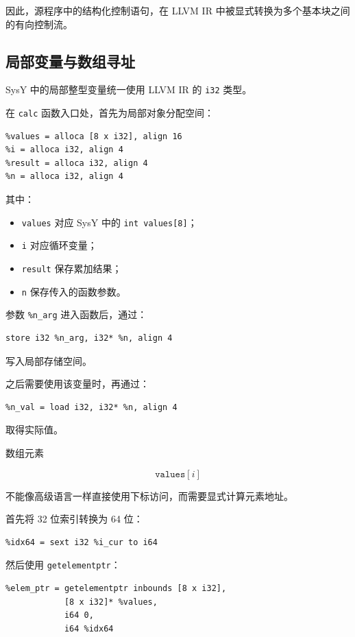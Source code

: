 \documentclass[12pt,a4paper]{ctexart}
\begin{document}
因此，源程序中的结构化控制语句，在 LLVM IR 中被显式转换为多个基本块之间的有向控制流。


\subsection{局部变量与数组寻址}

SysY 中的局部整型变量统一使用 LLVM IR 的 \texttt{i32} 类型。

在 \texttt{calc} 函数入口处，首先为局部对象分配空间：

\begin{lstlisting}
%values = alloca [8 x i32], align 16
%i = alloca i32, align 4
%result = alloca i32, align 4
%n = alloca i32, align 4
\end{lstlisting}

其中：

\begin{itemize}
    \item \texttt{values} 对应 SysY 中的 \texttt{int values[8]}；
    \item \texttt{i} 对应循环变量；
    \item \texttt{result} 保存累加结果；
    \item \texttt{n} 保存传入的函数参数。
\end{itemize}

参数 \texttt{\%n\_arg} 进入函数后，通过：

\begin{lstlisting}
store i32 %n_arg, i32* %n, align 4
\end{lstlisting}

写入局部存储空间。

之后需要使用该变量时，再通过：

\begin{lstlisting}
%n_val = load i32, i32* %n, align 4
\end{lstlisting}

取得实际值。

数组元素

\[
\texttt{values}[i]
\]

不能像高级语言一样直接使用下标访问，而需要显式计算元素地址。

首先将 32 位索引转换为 64 位：

\begin{lstlisting}
%idx64 = sext i32 %i_cur to i64
\end{lstlisting}

然后使用 \texttt{getelementptr}：

\begin{lstlisting}
%elem_ptr = getelementptr inbounds [8 x i32],
            [8 x i32]* %values,
            i64 0,
            i64 %idx64
\end{lstlisting}
\end{document}
